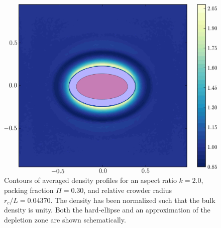 \begin{figure}
\includegraphics[width=\figurewidthSINGLE]{entropic_flow_paper/FIG1_EDIT.jpg}
\caption{Contours of averaged density profiles for an aspect ratio $k=2.0$, packing fraction $\Pi=0.30$, and relative crowder radius $r_c/L=0.04370$. The density has been normalized such that the bulk density is unity. Both the hard-ellipse and an approximation of the depletion zone are shown schematically.}
\label{fig:density_plot}
\end{figure}

